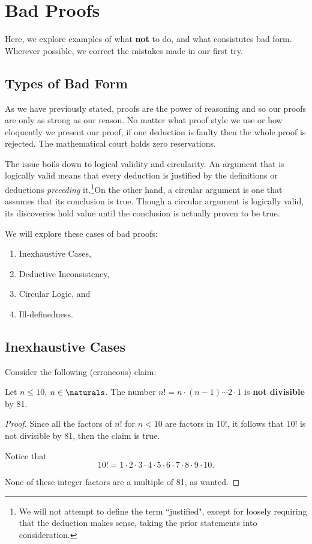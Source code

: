 \documentclass[../proofs.tex]{subfiles}
\newcommand{\ftjustified}{\footnote{We will not attempt to define the term
 ``justified", except for loosely requiring that the deduction makes sense,
taking the prior statements into consideration.}}
\begin{document}
\chapter{Bad Proofs}
Here, we explore examples of what \textbf{not} to do, and what consistutes bad
form. Wherever possible, we correct the mistakes made in our first try.

\section{Types of Bad Form}
As we have previously stated, proofs are the power of reasoning and so our
proofs are only as strong as our reason. No matter what proof style we use or
how eloquently we present our proof, if one deduction is faulty then the whole
proof is rejected. The mathematical court holds zero reservations.

The issue boils down to logical validity and circularity. An argument
that is logically valid means that every deduction is justified by the
definitions or deductions \emph{preceding} it.\ftjustified On the other hand,
a circular argument is one that assumes that its conclusion is true. Though a
circular argument is logically valid, its discoveries hold value until the
conclusion is actually proven to be true.

We will explore these cases of bad proofs:
\begin{enumerate}
  \item Inexhaustive Cases,
  \item Deductive Inconsistency,
  \item Circular Logic, and
  \item Ill-definedness.
\end{enumerate}

\section{Inexhaustive Cases}
Consider the following (erroneous) claim:
\begin{claim}
  Let $n \leq 10$, $n \in \naturals$. The number $n! = n \cdot (n-1) \cdots 2
  \cdot 1$ is \textbf{not divisible} by 81.
\end{claim}
\begin{proof}
  Since all the factors of $n!$ for $n < 10$ are factors in $10!$, it follows
  that $10!$ is not divisible by 81, then the claim is true.

  Notice that
  $$10! = 1 \cdot 2 \cdot 3 \cdot 4 \cdot 5
  \cdot 6 \cdot 7 \cdot 8 \cdot 9 \cdot 10.$$

  None of these integer factors are a multiple of 81, as wanted.
\end{proof}
\end{document}

